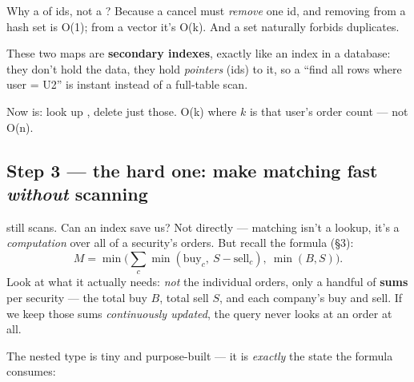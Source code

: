 Why a  of ids, not a ? Because a cancel must \emph{remove}
one id, and removing from a hash set is O(1); from a vector it's O(k). And a set
naturally forbids duplicates.

\begin{intu}
These two maps are \textbf{secondary indexes}, exactly like an index in a
database: they don't hold the data, they hold \emph{pointers} (ids) to it, so a
``find all rows where user = U2'' is instant instead of a full-table scan.
\end{intu}

Now  is: look up , delete just those.
O(k) where $k$ is that user's order count --- not O(n).

\subsection{Step 3 --- the hard one: make matching fast \emph{without} scanning}

 still scans. Can an index save us? Not directly
--- matching isn't a lookup, it's a \emph{computation} over all of a security's
orders. But recall the formula (\S3):
\[
M=\min\Big(\sum_c\min(\text{buy}_c,\ S-\text{sell}_c),\ \min(B,S)\Big).
\]
Look at what it actually needs: \emph{not} the individual orders, only a handful
of \textbf{sums} per security --- the total buy $B$, total sell $S$, and each
company's buy and sell. If we keep those sums \emph{continuously updated}, the
query never looks at an order at all.

\begin{center}
\end{center}

The nested type is tiny and purpose-built --- it is \emph{exactly} the state the
formula consumes:

